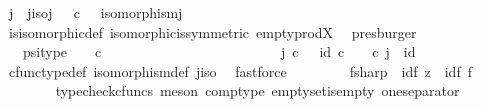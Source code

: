 \begin{isabellebody}
\ j\ \ j{\isacharunderscore}{\kern0pt}iso{\isacharcolon}{\kern0pt}{\isachardoublequoteopen}j{\isacharcolon}{\kern0pt}{\isasymemptyset}\ {\isasymrightarrow}\ {\isasymemptyset}\ {\isasymtimes}\isactrlsub c\ {\isasymone}\ {\isasymand}\ isomorphism{\isacharparenleft}{\kern0pt}j{\isacharparenright}{\kern0pt}{\isachardoublequoteclose}\isanewline
\ \ \ \ \ \ \isamarkupfalse%
\ is{\isacharunderscore}{\kern0pt}isomorphic{\isacharunderscore}{\kern0pt}def\ isomorphic{\isacharunderscore}{\kern0pt}is{\isacharunderscore}{\kern0pt}symmetric\ empty{\isacharunderscore}{\kern0pt}prod{\isacharunderscore}{\kern0pt}X\ \isamarkupfalse%
\ presburger\isanewline
\ \ \ \ \isamarkupfalse%
\ {\isasympsi}\ \ psi{\isacharunderscore}{\kern0pt}type{\isacharcolon}{\kern0pt}\ {\isachardoublequoteopen}{\isasympsi}\ {\isacharcolon}{\kern0pt}\ {\isasymemptyset}\ {\isasymtimes}\isactrlsub c\ {\isasymone}\ {\isasymrightarrow}\ {\isasymemptyset}\ {\isasymand}\isanewline
\ \ \ \ \ \ \ \ \ \ \ \ \ \ \ \ \ \ \ \ \ j\ {\isasymcirc}\isactrlsub c\ {\isasympsi}\ {\isacharequal}{\kern0pt}\ id{\isacharparenleft}{\kern0pt}{\isasymemptyset}\ {\isasymtimes}\isactrlsub c\ {\isasymone}{\isacharparenright}{\kern0pt}\ {\isasymand}\ {\isasympsi}\ {\isasymcirc}\isactrlsub c\ j\ {\isacharequal}{\kern0pt}\ id{\isacharparenleft}{\kern0pt}{\isasymemptyset}{\isacharparenright}{\kern0pt}{\isachardoublequoteclose}\isanewline
\ \ \ \ \ \ \isamarkupfalse%
\ cfunc{\isacharunderscore}{\kern0pt}type{\isacharunderscore}{\kern0pt}def\ isomorphism{\isacharunderscore}{\kern0pt}def\ j{\isacharunderscore}{\kern0pt}iso\ \isamarkupfalse%
\ fastforce\ \isanewline
\ \ \ \ \isamarkupfalse%
\ \isamarkupfalse%
\ f{\isacharunderscore}{\kern0pt}sharp\ {\isacharcolon}{\kern0pt}\ {\isachardoublequoteopen}id{\isacharparenleft}{\kern0pt}{\isasymemptyset}{\isacharparenright}{\kern0pt}{\isasymtimes}\isactrlsub f\ z\ {\isacharequal}{\kern0pt}\ id{\isacharparenleft}{\kern0pt}{\isasymemptyset}{\isacharparenright}{\kern0pt}{\isasymtimes}\isactrlsub f\ f\isactrlsup {\isasymsharp}{\isachardoublequoteclose}\isanewline
\ \ \ \ \ \ \isamarkupfalse%
\ {\isacharparenleft}{\kern0pt}typecheck{\isacharunderscore}{\kern0pt}cfuncs{\isacharcomma}{\kern0pt}\ meson\ comp{\isacharunderscore}{\kern0pt}type\ emptyset{\isacharunderscore}{\kern0pt}is{\isacharunderscore}{\kern0pt}empty\ one{\isacharunderscore}{\kern0pt}separator{\isacharparenright}{\kern0pt}\isanewline
\ \ \ \ \isamarkupfalse%

\end{isabellebody}
